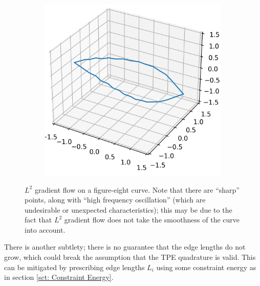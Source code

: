 \documentclass[../dissertation.tex]{subfiles}
\begin{document}
\begin{figure}[tbp]
\begin{subfigure}[b]{0.32\textwidth}
    \end{subfigure}
    \begin{subfigure}[b]{0.32\textwidth}
        \centering
        \includegraphics[width=\textwidth]{sections/unknottingCurveImgs/figure8-L2-2}
    \end{subfigure}

    \caption{$L^2$ gradient flow on a figure-eight curve. Note that there are ``sharp'' points, along with ``high frequency oscillation'' (which are undesirable or unexpected characteristics); this may be due to the fact that $L^2$ gradient flow does not take the smoothness of the curve into account.}
    \label{fig: L2 Curve Unknotting}
\end{figure}
There is another subtlety;
there is no guarantee that the edge lengths do not grow,
which could break the assumption that the TPE quadrature is valid.
This can be mitigated by prescribing edge lengths $L_i$ using some constraint energy as in section \ref{sct: Constraint Energy}.
\end{document}
